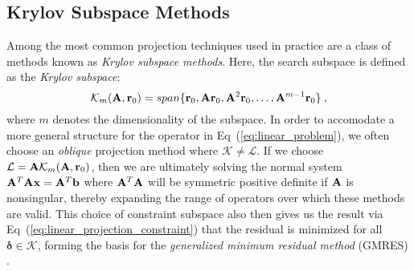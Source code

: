 \subsection{Krylov Subspace Methods}
\label{subsec:krylov_methods}
Among the most common projection techniques used in practice are a
class of methods known as \textit{Krylov subspace methods}. Here, the
search subspace is defined as the \textit{Krylov subspace}:
\begin{equation}
  \mathcal{K}_m(\mathbf{A},\mathbf{r}_0) = span\{\mathbf{r}_0, \mathbf{A}\mathbf{r}_0,
  \mathbf{A}^2\mathbf{r}_0, \dots, \mathbf{A}^{m-1}\mathbf{r}_0\}\:,
  \label{eq:krylov_subspace}
\end{equation}
where $m$ denotes the dimensionality of the subspace. In order to
accomodate a more general structure for the operator in
Eq~(\ref{eq:linear_problem}), we often choose an \textit{oblique}
projection method where $\mathcal{K} \neq \mathcal{L}$. If we choose
$\mathcal{L} = \mathbf{A} \mathcal{K}_m(\mathbf{A},\mathbf{r}_0)$, then we are
ultimately solving the normal system $\mathbf{A}^T\mathbf{A}\mathbf{x} =
\mathbf{A}^T\mathbf{b}$ where $\mathbf{A}^T\mathbf{A}$ will be symmetric positive
definite if $\mathbf{A}$ is nonsingular, thereby expanding the range of
operators over which these methods are valid. This choice of
constraint subspace also then gives us the result via
Eq~(\ref{eq:linear_projection_constraint}) that the residual is
minimized for all $\boldsymbol{\delta} \in \mathcal{K}$, forming the
basis for the \textit{generalized minimum residual method} (GMRES)
\citep{saad_1986}.

